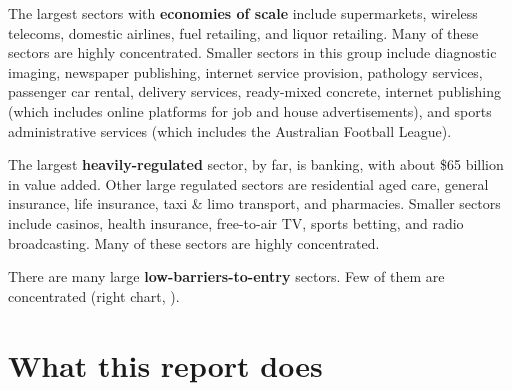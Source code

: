 The largest sectors with \textbf{economies of scale} include supermarkets, wireless telecoms, domestic airlines, fuel retailing, and liquor retailing. Many of these sectors are highly concentrated. Smaller sectors in this group include diagnostic imaging, newspaper publishing, internet service provision, pathology services,  passenger car rental, delivery services, ready-mixed concrete, internet publishing (which includes online platforms for job and house advertisements), and sports administrative services (which includes the Australian Football League).




The largest \textbf{heavily-regulated} sector, by far, is banking, with about \$65 billion in value added. Other large regulated sectors are residential aged care, general insurance, life insurance, taxi \& limo transport, and pharmacies. Smaller sectors include casinos, health insurance, free-to-air TV, sports betting, and radio broadcasting. Many of these sectors are highly concentrated.

There are many large \textbf{low-barriers-to-entry} sectors. Few of them are concentrated (right chart, ).

\newpage
\section{What this report does}

